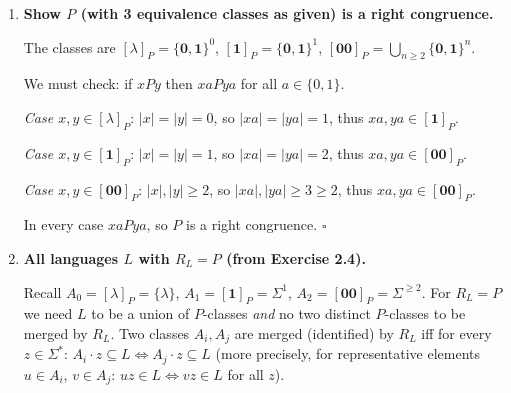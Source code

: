 \begin{enumerate}[{2.}1.]
\textit{Justification}: If $L\neq\emptyset$ and $L\neq\Sigma^*$, pick $w\in L$ and $u\notin L$. Then $w R_L u$ fails (take $z=\lambda$), so $R_L$ has at least 2 classes.

\item \textbf{Show $P$ (with 3 equivalence classes as given) is a right congruence.}

The classes are $[\lambda]_P=\{\mathbf{0},\mathbf{1}\}^0$, $[\mathbf{1}]_P=\{\mathbf{0},\mathbf{1}\}^1$, $[\mathbf{00}]_P=\bigcup_{n\geq 2}\{\mathbf{0},\mathbf{1}\}^n$.

We must check: if $x P y$ then $xa P ya$ for all $a\in\{0,1\}$.

\textit{Case $x,y\in[\lambda]_P$}: $|x|=|y|=0$, so $|xa|=|ya|=1$, thus $xa,ya\in[\mathbf{1}]_P$.

\textit{Case $x,y\in[\mathbf{1}]_P$}: $|x|=|y|=1$, so $|xa|=|ya|=2$, thus $xa,ya\in[\mathbf{00}]_P$.

\textit{Case $x,y\in[\mathbf{00}]_P$}: $|x|,|y|\geq 2$, so $|xa|,|ya|\geq 3\geq 2$, thus $xa,ya\in[\mathbf{00}]_P$.

In every case $xa P ya$, so $P$ is a right congruence. $\square$

\item \textbf{All languages $L$ with $R_L=P$ (from Exercise 2.4).}

Recall $A_0=[\lambda]_P=\{\lambda\}$, $A_1=[\mathbf{1}]_P=\Sigma^1$, $A_2=[\mathbf{00}]_P=\Sigma^{\geq 2}$.
For $R_L=P$ we need $L$ to be a union of $P$-classes \emph{and} no two distinct $P$-classes to be merged by $R_L$.
Two classes $A_i, A_j$ are merged (identified) by $R_L$ iff for every $z\in\Sigma^*$: $A_i\cdot z \subseteq L \Leftrightarrow A_j\cdot z\subseteq L$ (more precisely, for representative elements $u\in A_i$, $v\in A_j$: $uz\in L\Leftrightarrow vz\in L$ for all $z$).


\end{enumerate}
